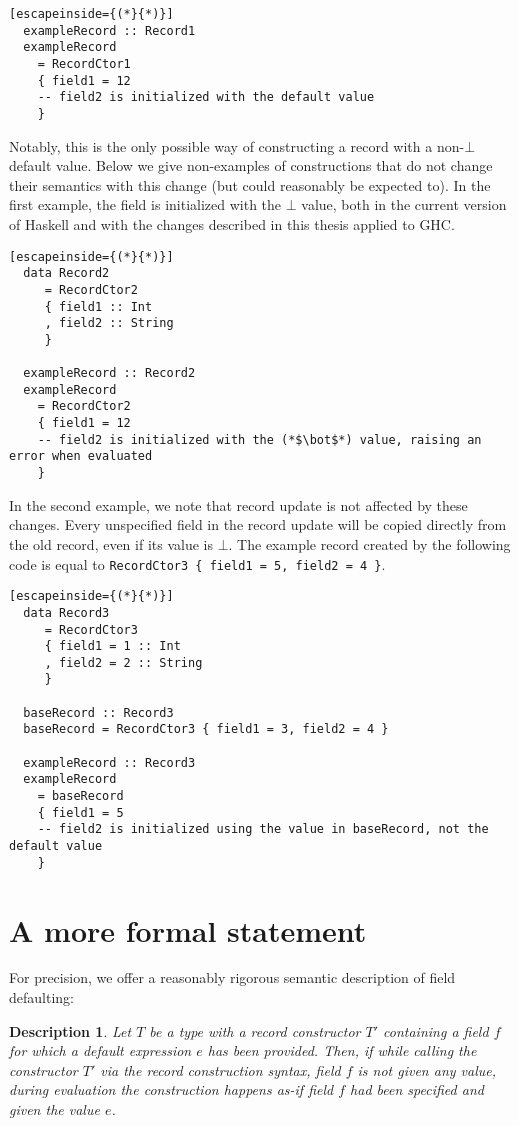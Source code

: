 \documentclass[en]{pracamgr}
\begin{document}
\begin{lstlisting}[escapeinside={(*}{*)}]
  exampleRecord :: Record1
  exampleRecord 
    = RecordCtor1
    { field1 = 12
    -- field2 is initialized with the default value
    }
\end{lstlisting}

Notably, this is the only possible way of constructing a record with a non-$\bot$ default value.
Below we give non-examples of constructions that do not change their semantics with this change (but could reasonably be expected to).
In the first example, the field is initialized with the $\bot$ value, both in the current version of Haskell and with the changes described in this thesis applied to GHC.

\begin{lstlisting}[escapeinside={(*}{*)}]
  data Record2
     = RecordCtor2 
     { field1 :: Int
     , field2 :: String
     }  

  exampleRecord :: Record2
  exampleRecord 
    = RecordCtor2 
    { field1 = 12
    -- field2 is initialized with the (*$\bot$*) value, raising an error when evaluated
    }

\end{lstlisting}

In the second example, we note that record update is not affected by these changes. 
Every unspecified field in the record update will be copied directly from the old record, even if its value is $\bot$.
The example record created by the following code is equal to \texttt{RecordCtor3 \{ field1 = 5, field2 = 4 \}}.

\begin{lstlisting}[escapeinside={(*}{*)}]
  data Record3
     = RecordCtor3
     { field1 = 1 :: Int
     , field2 = 2 :: String
     }  

  baseRecord :: Record3
  baseRecord = RecordCtor3 { field1 = 3, field2 = 4 }

  exampleRecord :: Record3
  exampleRecord 
    = baseRecord
    { field1 = 5
    -- field2 is initialized using the value in baseRecord, not the default value
    }

\end{lstlisting}

\section{A more formal statement}
For precision, we offer a reasonably rigorous semantic description of field defaulting:
\newtheorem{remark}{Description}
\begin{remark}
  \normalfont
  Let $T$ be a type with a record constructor $T'$ containing a field $f$ for which a default expression $e$ has been provided.
  Then, if while calling the constructor $T'$ via the record construction syntax, field $f$ is not given any value, during evaluation the construction happens \textit{as-if} field $f$ had been specified and given the value $e$.
\end{remark}
\end{document}
